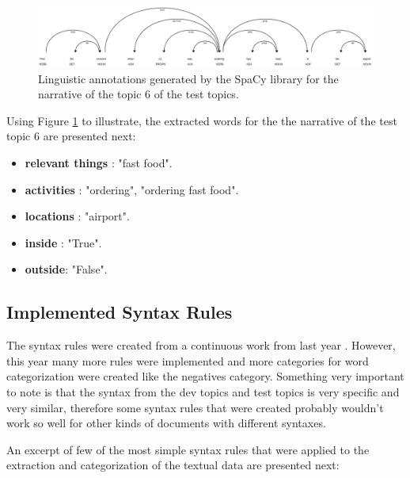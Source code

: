 \begin{figure}[H]
    \centering
    \captionsetup{justification=centering}
    \includegraphics[width =  \textwidth]{Sections/6textprocessing/images/spacy.png}
    \caption{Linguistic annotations generated by the SpaCy library \cite{Spacy2017} for the narrative of the topic 6 of the test topics.}
    \label{fig:spacy_labels}
  \end{figure}

 
Using Figure \ref{fig:spacy_labels} to illustrate, the extracted words for the the narrative of the test topic 6 are presented next:
\newpage
    \begin{itemize}
      \itemsep0em
        \item \textbf{relevant things} : "fast food".
        \item \textbf{activities} : "ordering", "ordering fast food".
        \item \textbf{locations} : "airport".
        \item \textbf{inside} : "True".
        \item \textbf{outside}: "False".
       
    \end{itemize}

  \subsection{Implemented Syntax Rules}
  The syntax rules were created from a continuous work from last year \cite{Ribeiro2019}. However, this year many more rules were implemented and more categories for word categorization were created like the negatives category. Something very important to note is that the syntax from the dev topics and test topics is very specific and very similar, therefore some syntax rules that were created probably wouldn't work so well for other kinds of documents with different syntaxes.

  An excerpt of few of the most simple syntax rules that were applied to the extraction and categorization of the textual data are presented next:
  
